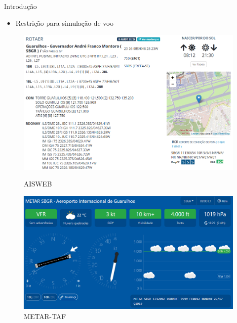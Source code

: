 \documentclass{beamer}
\begin{document}
\begin{frame}{Introdução}
    \begin{itemize}
        \item Restrição para simulação de voo
    \end{itemize}
    \pause
    \begin{figure}[ht]
        \begin{minipage}[b]{0.45\linewidth}
            \centering
            \includegraphics[width=\textwidth]{img/aisweb.png}
            \caption{AISWEB}
        \end{minipage}
        \hspace{0.5cm}
        \pause
        \begin{minipage}[b]{0.45\linewidth}
            \centering
            \includegraphics[width=\textwidth]{img/metar-taf.png}
            \caption{METAR-TAF}
        \end{minipage}
    \end{figure}
\end{frame}
\end{document}

